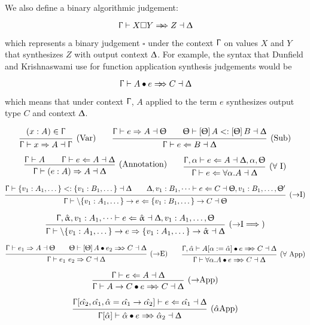 \documentclass{article}
\newcommand{\arrow}{\to}
\newcommand{\rcd}[1]{\{#1\}}
\newcommand{\spc}{\qquad}
\newcommand{\ctx}{\Upgamma}
\newcommand{\ctxalt}{\Updelta}
\newcommand{\ctxaltt}{\Uptheta}
\newcommand{\var}{v}
\newcommand{\tp}{A}
\newcommand{\tpalt}{B}
\newcommand{\tpaltt}{C}
\newcommand{\ev}{\hat}
\newcommand{\evar}[1][]{\ev \upalpha_{#1}}
\newcommand{\ctxinout}[3]{#1 \vdash #2 \dashv #3}
\newcommand{\synth}[4]{\ctxinout {#1} {#2 \Rightarrow #3} {#4}}
\renewcommand{\check}[4]{\ctxinout {#1} {#2 \Leftarrow #3} {#4}}
\newcommand{\subsume}{<:}
\newcommand{\subsumes}[4]{\ctxinout {#1} {#2 \subsume #3} {#4}}
\newcommand{\synthesizes}{\Rightarrow \!\!\! \Rightarrow}
\newcommand{\presynth}[6]{\ctxinout {#1} {#2 #3 #4 \synthesizes #5} {#6}}
\newcommand{\app}{\bullet}
\newcommand{\appsynth}[5]{\presynth {#1} {#2} \app {#3} {#4} {#5}}
\newcommand{\apply}[1]{\left[#1\right]}
\newcommand{\deduct}[3][]
{
  \begin{prooftree}
    \hypo{#2}
    \infer1[\text{#1}]{#3}
  \end{prooftree}
}
\begin{document}
We also define a binary algorithmic judgement:

\[
\presynth{\ctx}{X}{\square}{Y}{Z}{\ctxalt}
\]

which represents a binary judgement \(\square\) under the context \(\ctx\) on
values \(X\) and \(Y\) that synthesizes \(Z\) with output context \(\ctxalt\).
For example, the syntax that Dunfield and Krishnaswami use for function
application synthesis judgements would be

\[
\appsynth \ctx A e C \ctxalt
\]

which means that under context \(\ctx\), \(A\) applied to the term \(e\)
synthesizes output type \(C\) and context \(\ctxalt\).

\[
  \deduct[(Var)]
  {
    (x : A) \in \ctx
  }
  { \synth{\ctx}{x}{A}{\ctx} }
  \spc
  \deduct[(Sub)]
  {
    \synth{\ctx}{e}{A}{\ctxaltt} \spc
    \subsumes{\ctxaltt}{\apply\ctxaltt A}{\apply\ctxaltt B}{\ctxalt}
  }
  { \check{\ctx}{e}{B}{\ctxalt} }
\]

\[
  \deduct[(Annotation)]
  { \ctx \vdash A \spc \check{\ctx}{e}{A}{\ctxalt} }
  { \synth{\ctx}{(e : A)}{A}{\ctxalt} }
  \spc
  \deduct[(\(\forall\) I)]
  { \check{\ctx, \alpha}{e}{A}{\ctxalt, \alpha, \ctxaltt} }
  { \check{\ctx}{e}{\forall \alpha. A}{\ctxalt} }
\]

\[
  \deduct[(\(\to\)I)]
  { \subsumes \ctx {\rcd{v_1:\tp_1,\dots}} {\rcd{v_1:\tpalt_1,\dots}} \ctxalt \spc \check{\ctxalt, \var_1 : \tpalt_1, \dots}{e}{\tpaltt}{\ctxaltt, \var_1 : \tpalt_1,
      \dots,  \ctxaltt'} }
  { \check{\ctx}{\backslash \rcd{\var_1:\tp_1,\dots} \arrow e}{ \rcd{\var_1:\tpalt_1,\dots} \arrow \tpaltt}{\ctxaltt} }
\]

\[
  \deduct[(\(\to\)I\(\implies\))]
  { \check{\ctx, \evar, \var_1 : \tp_1, \dots}{e}{\evar}{\ctxalt, \var_1 :
      \tp_1, \dots,  \ctxaltt} }
  { \synth{\ctx}{\backslash \rcd{\var_1:\tp_1,\dots} \arrow e}{{\rcd{\var_1:\tp_1,\dots}} \arrow \evar}{\ctxalt} }
\]

\[
  \deduct[(\(\to\)E)]
  { \synth{\ctx}{e_1}{A}{\ctxaltt} \spc \presynth{\ctxaltt}{\apply\ctxaltt A}{\app}{e_2}{C}{\ctxalt} }
  { \synth{\ctx}{e_1 \ e_2}{C}{\ctxalt}  }
  \spc
  \deduct[(\(\forall\) App)]
  { \presynth{\ctx, \ev\alpha}{A[\alpha := \ev\alpha]}{\app}{e}{C}{\ctxalt} }
  { \presynth{\ctx}{\forall \alpha. A}{\app}{e}{C}{\ctxalt} }
\]

\[
  \deduct[(\(\to\)App)]
    { \check{\ctx}{e}{A}{\ctxalt} }
    { \presynth{\ctx}{A \to C}{\app}{e}{C}{\ctxalt} }
\]

\[
  \deduct[(\(\ev\alpha\)App)]
    {
      \check{\ctx[\ev{\alpha_2}, \ev{\alpha_1}, \ev \alpha = \ev{\alpha_1} \to
        \ev{\alpha_2}]}{e}{\ev{\alpha_1}}{\ctxalt}
    }
    { \presynth{\ctx[\ev\alpha]}{\ev\alpha}{\app}{e}{\ev\alpha_2}{\ctxalt} }
\]
\end{document}
